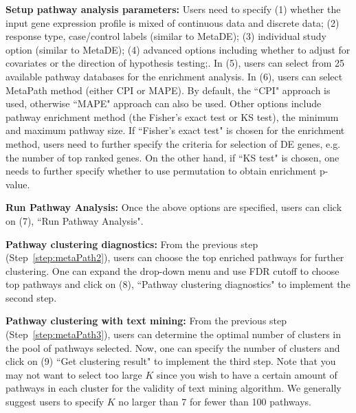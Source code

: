 \begin{steps}
\item \textbf{Setup pathway analysis parameters:}
Users need to specify {\color{red}(1) } whether the input gene expression profile is mixed of continuous data and discrete data;
{\color{red}(2)} response type, case/control labels (similar to MetaDE);
{\color{red}(3)} individual study option (similar to MetaDE);
{\color{red}(4)} advanced options including whether to adjust for covariates or the direction of hypothesis testing;.
In {\color{red}(5)}, users can select from 25 available pathway databases for the enrichment analysis.
In {\color{red}(6)}, users can select MetaPath method (either CPI or MAPE).
By default, the ``CPI" approach is used, otherwise ``MAPE" approach can also be used. Other options include pathway enrichment method (the Fisher's exact test or KS test), the minimum and maximum pathway size. If ``Fisher's exact test" is chosen for the enrichment method, users need to further specify the criteria for selection of DE genes, e.g. the number of top ranked genes. On the other hand, if ``KS test" is chosen, one needs to further specify whether to use permutation to obtain enrichment p-value. 

\item \textbf{Run Pathway Analysis:}
\label{step:metaPath1}
Once the above options are specified, users can click on {\color{red}(7)}, ``Run Pathway Analysis".

\textbf{Pathway clustering diagnostics:} 
\label{step:metaPath2}
From the previous step (Step~\ref{step:metaPath2}), users can choose the top enriched pathways for further clustering. 
One can expand the drop-down menu and use FDR cutoff to choose top pathways and click on {\color{red}(8)}, ``Pathway clustering diagnostics" to implement the second step.

\textbf{Pathway clustering with text mining:} 
\label{step:metaPath3}
From the previous step (Step~\ref{step:metaPath3}), users can determine the optimal number of clusters in the pool of pathways selected. 
Now, one can specify the number of clusters and click on {\color{red}(9)} ``Get clustering result" to implement the third step. 
Note that you may not want to select too large $K$ since you wish to have a certain amount of pathways in each cluster for the validity of text mining algorithm. 
We generally suggest users to specify $K$ no larger than 7 for fewer than 100 pathways. 
\end{steps}






